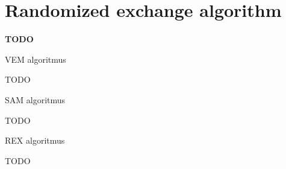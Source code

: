 \chapter{Randomized exchange algorithm}

\textbf{TODO}

\begin{algorithm}[H]
	\caption{VEM algoritmus \cite{rex_harman}}
	\label{vem}
	\begin{algorithmic}[1]
		\State TODO
	\end{algorithmic}
\end{algorithm}

\begin{algorithm}[H]
	\caption{SAM algoritmus \cite{rex_harman}}
	\label{sam}
	\begin{algorithmic}[1]
		\State TODO
	\end{algorithmic}
\end{algorithm}

\begin{algorithm}[H]
	\caption{REX algoritmus \cite{rex_harman}}
	\label{rex}
	\begin{algorithmic}[1]
		\State TODO
	\end{algorithmic}
\end{algorithm}


